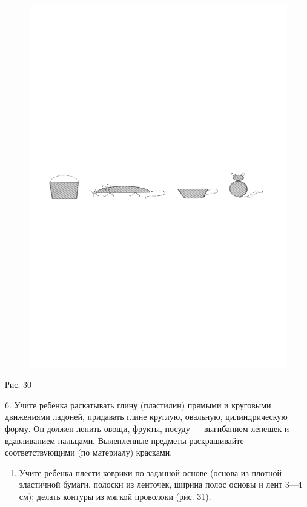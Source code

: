 \documentclass[a5paper]{book}
\begin{document}
\begin{figure}
\centering
\includegraphics[width=\linewidth]{media/media/image27.png}
\end{figure}

Рис. 30

6. Учите ребенка раскатывать глину (пластилин) прямыми и круговыми
движениями ладоней, придавать глине круглую, овальную, цилиндрическую
форму. Он должен лепить овощи, фрукты, посуду --- выгибанием лепешек и
вдавливанием пальцами. Вылепленные предметы раскрашивайте
соответствующими (по материалу) красками.


\begin{enumerate}
\def\labelenumi{\arabic{enumi}.}
\setcounter{enumi}{6}
\item
  
  Учите ребенка плести коврики по заданной основе (основа из плотной
  эластичной бумаги, полоски из ленточек, ширина полос основы и лент
  3---4 см); делать контуры из мягкой проволоки (рис. 31).
  
\end{enumerate}
\end{document}
